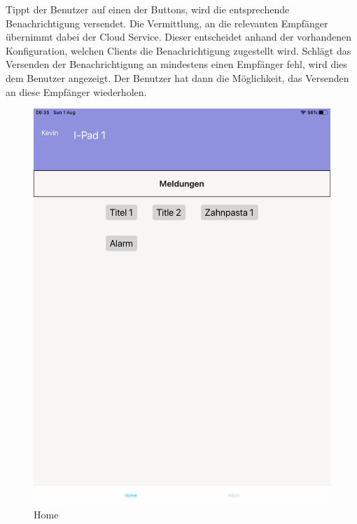 Tippt der Benutzer auf einen der Buttons, wird die entsprechende Benachrichtigung versendet.
Die Vermittlung, an die relevanten Empfänger übernimmt dabei der Cloud Service.
Dieser entscheidet anhand der vorhandenen Konfiguration, welchen Clients die Benachrichtigung zugestellt wird.
Schlägt das Versenden der Benachrichtigung an mindestens einen Empfänger fehl, wird dies dem Benutzer angezeigt.
Der Benutzer hat dann die Möglichkeit, das Versenden an diese Empfänger wiederholen.

\begin{figure}[h]
    \centering
    \begin{minipage}[b]{0.4\textwidth}
        \includegraphics[width=\textwidth]{graphics/screenshots/mobileclient/screenshot-homescreen}
        \caption{Home}
    \end{minipage}
    \hfill
    \begin{minipage}[b]{0.4\textwidth}

\end{minipage}
\end{figure}
